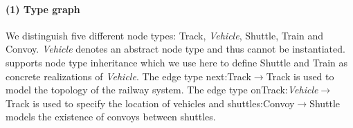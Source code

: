 
\halflineup
\paragraph{(1) Type graph}
We distinguish five different node types: \textsf{Track}, \textsf{\textit{Vehicle}}, \textsf{Shuttle}, \textsf{Train} and \textsf{Convoy}. \textsf{\textit{Vehicle}} denotes an abstract node type and thus cannot be instantiated. \henshin supports node type inheritance which we use here to define \textsf{Shuttle} and \textsf{Train} as concrete realizations of \textsf{\textit{Vehicle}}. The edge type \textsf{next:Track}$\to$\textsf{Track} is used to model the topology of the railway system. The edge type \textsf{onTrack:\textit{Vehicle}}$\to$\textsf{Track} is used to specify the location of vehicles and \textsf{shuttles:Convoy}$\to$\textsf{Shuttle} models the existence of convoys between shuttles.


\halflineup

